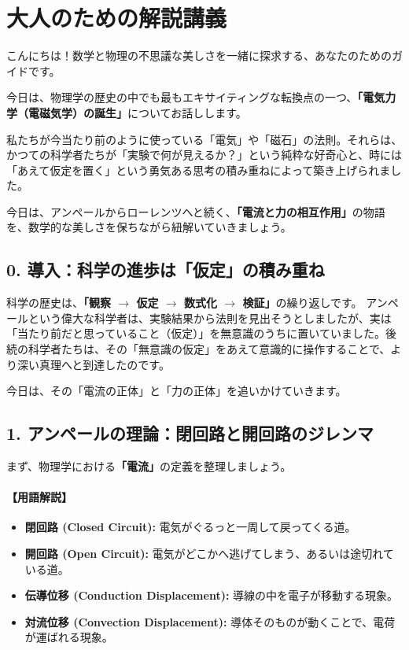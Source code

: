 \documentclass[a4paper,11pt,openany]{ltjsbook}
\begin{document}
\section{大人のための解説講義}
\begin{lecturebox}
こんにちは！数学と物理の不思議な美しさを一緒に探求する、あなたのためのガイドです。

今日は、物理学の歴史の中でも最もエキサイティングな転換点の一つ、\textbf{「電気力学（電磁気学）の誕生」}についてお話しします。

私たちが今当たり前のように使っている「電気」や「磁石」の法則。それらは、かつての科学者たちが「実験で何が見えるか？」という純粋な好奇心と、時には「あえて仮定を置く」という勇気ある思考の積み重ねによって築き上げられました。

今日は、アンペールからローレンツへと続く、\textbf{「電流と力の相互作用」}の物語を、数学的な美しさを保ちながら紐解いていきましょう。

\subsection*{0. 導入：科学の進歩は「仮定」の積み重ね}
科学の歴史は、\textbf{「観察 $\rightarrow$ 仮定 $\rightarrow$ 数式化 $\rightarrow$ 検証」}の繰り返しです。
アンペールという偉大な科学者は、実験結果から法則を見出そうとしましたが、実は「当たり前だと思っていること（仮定）」を無意識のうちに置いていました。後続の科学者たちは、その「無意識の仮定」をあえて意識的に操作することで、より深い真理へと到達したのです。

今日は、その「電流の正体」と「力の正体」を追いかけていきます。

\subsection*{1. アンペールの理論：閉回路と開回路のジレンマ}

まず、物理学における\textbf{「電流」}の定義を整理しましょう。

\paragraph{【用語解説】}
\begin{itemize}[leftmargin=2em]
\item \textbf{閉回路 (Closed Circuit):} 電気がぐるっと一周して戻ってくる道。
\item \textbf{開回路 (Open Circuit):} 電気がどこかへ逃げてしまう、あるいは途切れている道。
\item \textbf{伝導位移 (Conduction Displacement):} 導線の中を電子が移動する現象。
\item \textbf{対流位移 (Convection Displacement):} 導体そのものが動くことで、電荷が運ばれる現象。
\end{itemize}


\end{lecturebox}
\end{document}
